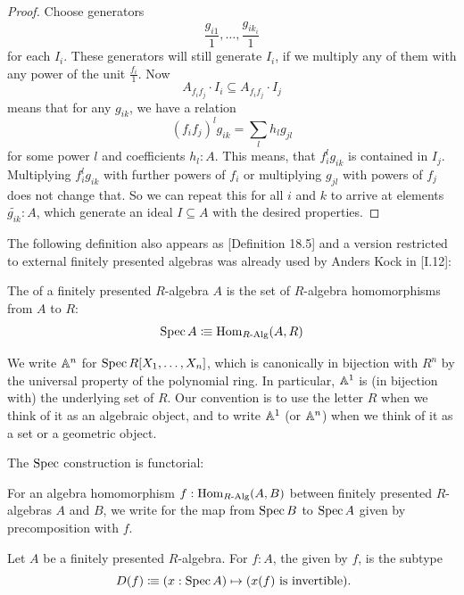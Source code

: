 \begin{proof}
  Choose generators 
  \[ \frac{g_{i1}}{1},\dots,\frac{g_{ik_i}}{1} \]
  for each $I_i$.
  These generators will still generate $I_i$, if we multiply any of them with any power of the unit $\frac{f_i}{1}$.
  Now
  \[ A_{f_if_j}\cdot I_i\subseteq A_{f_if_j}\cdot I_j \]
  means that for any $g_{ik}$, we have a relation
  \[ (f_if_j)^l g_{ik}=\sum_{l}h_{l}g_{jl}\]
  for some power $l$ and coefficients $h_{l}:A$.
  This means, that $f_i^lg_{ik}$ is contained in $I_j$.
  Multiplying $f_i^lg_{ik}$ with further powers of $f_i$ or multiplying $g_{jl}$ with powers of $f_j$ does not change that.
  So we can repeat this for all $i$ and $k$ to arrive at elements $\tilde{g_{ik}}:A$,
  which generate an ideal $I\subseteq A$ with the desired properties.
\end{proof}

The following definition also appears as \cite{ingo-thesis}[Definition 18.5]
and a version restricted to external finitely presented algebras was already used by Anders Kock in \cite{kock-sdg}[I.12]:

\begin{definition}
  \label{spec}
  The  of a finitely presented $R$-algebra $A$
  is the set of $R$-algebra homomorphisms from $A$ to $R$:
  \[ \operatorname{Spec} A \vcentcolon\mspace{-1.2mu}\equiv \mathrm{Hom}_{R\text{-}\mathrm{Alg}}(A, R) \]
\end{definition}

We write $\mathbb{A}^n$ for $\operatorname{Spec} R[X_1, \dots, X_n]$,
which is canonically in bijection with $R^n$
by the universal property of the polynomial ring.
In particular,
$\mathbb{A}^1$ is (in bijection with) the underlying set of $R$.
Our convention is to use the letter $R$
when we think of it as an algebraic object,
and to write $\mathbb{A}^1$ (or $\mathbb{A}^n$) when we think of it as a set or a geometric object.

The $\operatorname{Spec}$ construction is functorial:

\begin{definition}
  \label{spec-on-maps}
  For an algebra homomorphism $f:\mathrm{Hom}_{R\text{-}\mathrm{Alg}}(A,B)$
  between finitely presented $R$-algebras $A$ and $B$,
  we write  for the map from $\operatorname{Spec} B$ to $\operatorname{Spec} A$
  given by precomposition with $f$.
\end{definition}

\begin{definition}%
  \label{basic-open-subset}
  Let $A$ be a finitely presented $R$-algebra.
  For $f:A$, the  given by $f$,
  is the subtype 
  \[
    D(f)\colonequiv (x:\Spec A)\mapsto (x(f)\text{ is invertible})
    \rlap{.}
  \]
\end{definition}

